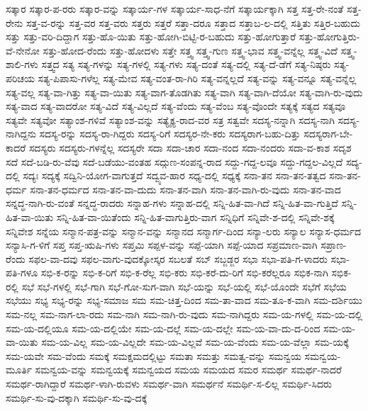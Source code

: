 {ಸತ್ಕಾರ
ಸತ್ಕಾರ-ಪ-ರರು
ಸತ್ಕಾರ-ವನ್ನು
ಸತ್ಕಾರ್ಯ-ಗಳ
ಸತ್ಕಾರ್ಯ-ಸಾಧ-ನೆಗೆ
ಸತ್ಕಾರ್ಯಕ್ಕಾಗಿ
ಸತ್ತ
ಸತ್ತ-ರೇ-ನಂತೆ
ಸತ್ತ-ರೇನು
ಸತ್ತ-ವ-ರನ್ನು
ಸತ್ತ-ವರ
ಸತ್ತ-ವರು
ಸತ್ತರು
ಸತ್ತರೆ
ಸತ್ತಾ-ದರೂ
ಸತ್ತಾದ
ಸತ್ತಾಬ-ಲ-ದಲ್ಲಿ
ಸತ್ತಿತು
ಸತ್ತಿರ-ಬಹುದು
ಸತ್ತು
ಸತ್ತು-ವರಿ-ದಿದ್ದಾಗ
ಸತ್ತು-ಹೊ-ಯಿತು
ಸತ್ತು-ಹೋಗಿ-ಬಿಟ್ಟಿ-ರ-ಬಹುದು
ಸತ್ತು-ಹೋಗುತ್ತಾರೆ
ಸತ್ತು-ಹೋಗುತ್ತಿರು-ವೆ-ನೇನೋ
ಸತ್ತು-ಹೋದ-ರೆಂದು
ಸತ್ತು-ಹೋದಳು
ಸತ್ತೇ
ಸತ್ತ್ವ
ಸತ್ತ್ವ-ಗುಣ
ಸತ್ತ್ವ-ಭಾವ
ಸತ್ತ್ವ-ವನ್ನೆಲ್ಲ
ಸತ್ತ್ವ-ವಿದೆ
ಸತ್ತ್ವ-ಶಾಲಿ-ಗಳು
ಸತ್ತ್ವದ
ಸತ್ಯ
ಸತ್ಯ-ಗಳನ್ನು
ಸತ್ಯ-ಗಳಲ್ಲಿ
ಸತ್ಯ-ಗಳು
ಸತ್ಯ-ದಂತೆ
ಸತ್ಯ-ದಲ್ಲಿ
ಸತ್ಯ-ದೆ-ಡೆಗೆ
ಸತ್ಯ-ನಿಷ್ಠರು
ಸತ್ಯ-ಪರಿಚಯ
ಸತ್ಯ-ಪಿಪಾಸು-ಗಳೆಲ್ಲ
ಸತ್ಯ-ಮೇವ
ಸತ್ಯ-ವಂತ-ರಾ-ಗಿರಿ
ಸತ್ಯ-ವನ್ನಲ್ಲದೆ
ಸತ್ಯ-ವನ್ನು
ಸತ್ಯ-ವನ್ನೂ
ಸತ್ಯ-ವನ್ನೆಲ್ಲ
ಸತ್ಯ-ವಲ್ಲ
ಸತ್ಯ-ವಾ-ಗಿತ್ತು
ಸತ್ಯ-ವಾ-ಯಿತು
ಸತ್ಯ-ವಾಗ-ತೊಡಗಿತು
ಸತ್ಯ-ವಾಗಿ
ಸತ್ಯ-ವಾಗಿ-ದೆಯೋ
ಸತ್ಯ-ವಾಗಿ-ರು-ವುದು
ಸತ್ಯ-ವಾದ
ಸತ್ಯ-ವಾದರೋ
ಸತ್ಯ-ವಿದೆ
ಸತ್ಯ-ವಿಲ್ಲದೆ
ಸತ್ಯ-ವೆಂದು
ಸತ್ಯ-ವೆಂಬ
ಸತ್ಯ-ವೊಂದೇ
ಸತ್ಯಕ್ಕೆ
ಸತ್ಯದ
ಸತ್ಯವೂ
ಸತ್ಯವೇ
ಸತ್ಯವೋ
ಸತ್ಯಾಂಶ-ಗಳಿವೆ
ಸತ್ಯಾಂಶ-ವನ್ನು
ಸತ್ಯೈಕ್ಯ-ರಾದ-ವರ
ಸತ್ರ
ಸತ್ವವೇ
ಸದಸ್ಯ-ನನ್ನಾಗಿ
ಸದಸ್ಯ-ನಾಗಿ
ಸದಸ್ಯ-ನಾಗಿದ್ದನು
ಸದಸ್ಯ-ರನ್ನು
ಸದಸ್ಯ-ರಾ-ಗಿದ್ದರು
ಸದಸ್ಯ-ರಿಗೆ
ಸದಸ್ಯರ-ನೇ-ಕರು
ಸದಸ್ಯರಾಗ-ಬಹು-ದಿತ್ತು
ಸದಸ್ಯರಾಗ-ಬೇ-ಕಾದರೆ
ಸದಸ್ಯರು
ಸದಸ್ಯರು-ಗಳನ್ನೆಲ್ಲ
ಸದಸ್ಯರೇ
ಸದಾ
ಸದಾ-ಚಾರ
ಸದಾ-ನಂದ
ಸದಾ-ನಂದರು
ಸದಾ-ವ-ಕಾಶ
ಸದೃಶ
ಸದೆ
ಸದೆ-ಬಡಿ-ರು-ವೆವು
ಸದೆ-ಬಡೆಯು-ವಂತಹ
ಸದ್ಗುಣ-ಸಂಪನ್ನ-ರಾದ
ಸದ್ದು-ಗದ್ದ-ಲವೂ
ಸದ್ದು-ಗದ್ದಲ-ವಿಲ್ಲದೆ
ಸದ್ಯ-ದಲ್ಲಿ
ಸದ್ಯಃ
ಸದ್ಯಕ್ಕೆ
ಸದ್ವಿನಿ-ಯೋಗ-ವಾಗುತ್ತದೆ
ಸದ್ವ್ಯವ-ಹಾರ
ಸಧ್ಯ-ದಲ್ಲಿ
ಸಧ್ಯಕ್ಕೆ
ಸನಾ-ತನ
ಸನಾ-ತನ-ತತ್ವದ
ಸನಾ-ತನ-ಧರ್ಮ
ಸನಾ-ತನ-ಧರ್ಮದ
ಸನಾ-ತನ-ವಾ-ದುದು
ಸನಾ-ತನ-ವಾಗಿ
ಸನಾ-ತನ-ವಾಗಿ-ರು-ವುದು
ಸನಾ-ತನ-ವಾದ
ಸನ್ನದ್ಧ-ನಾಗಿ-ರು-ವಂತೆ
ಸನ್ನದ್ಧ-ರಾದರು
ಸನ್ನಾಹ-ಗಳು
ಸನ್ನಾಹ-ದಲ್ಲಿ
ಸನ್ನಿ-ಹಿತ-ವಾ-ಗಿದೆ
ಸನ್ನಿ-ಹಿತ-ವಾ-ಗುತ್ತಿದೆ
ಸನ್ನಿ-ಹಿತ-ವಾ-ಯಿತು
ಸನ್ನಿ-ಹಿತ-ವಾ-ಯಿತೆಂದು
ಸನ್ನಿ-ಹಿತ-ವಾಗುತ್ತಿರು-ವಾಗ
ಸನ್ನಿಧಿಗೆ
ಸನ್ನಿವೇ-ಶ-ದಲ್ಲಿ
ಸನ್ನಿವೇ-ಶಕ್ಕೆ
ಸನ್ನಿವೇಶ
ಸನ್ನೆಯ
ಸನ್ಮಾನ-ಪತ್ರ-ವನ್ನು
ಸನ್ಮಾನ-ವನ್ನು
ಸನ್ಮಾನದ
ಸನ್ಮಾರ್ಗ-ದಿಂದ
ಸನ್ಯಾ-ಲರು
ಸನ್ಯಾಲ
ಸನ್ಯಾಸ-ಧರ್ಮದ
ಸನ್ಯಾಸಿ-ಗ-ಳಿಗೆ
ಸಪ್ತ
ಸಪ್ತ-ಋಷಿ-ಗಳು
ಸಪ್ತಮಿ
ಸಪ್ಪಳ-ವನ್ನು
ಸಪ್ಪೆ-ಯಾಗಿ
ಸಪ್ಪೆ-ಯಾದ
ಸಪ್ರಮಾಣ-ವಾಗಿ
ಸಪ್ರಾಣ-ರೆಂದು
ಸಫಲ-ವಾ-ದವು
ಸಫಲ-ವಾಗು-ವುದಕ್ಕೋಸ್ಕರ
ಸಬಲತೆ
ಸಬ್
ಸಬ್ಜಡ್ಜರ
ಸಭಾ
ಸಭಾ-ಪತಿ-ಗ-ಳಾದರು
ಸಭಾ-ಪತಿ-ಗಳೂ
ಸಭಿ-ಕ-ರನ್ನು
ಸಭಿ-ಕ-ರಿಗೆ
ಸಭಿ-ಕ-ರೆಲ್ಲ
ಸಭಿ-ಕರು
ಸಭಿ-ಕರೆ-ದು-ರಿಗೆ
ಸಭಿ-ಕರೆಲ್ಲರೂ
ಸಭಿಕ-ನಾಗಿ
ಸಭಿಕ-ರಲ್ಲಿ
ಸಭೆ
ಸಭೆ-ಗಳಲ್ಲಿ
ಸಭೆ-ಗಾಗಿ
ಸಭೆ-ಗೋ-ಸುಗ-ವಾಗಿ
ಸಭೆ-ಯನ್ನು
ಸಭೆ-ಯಲ್ಲಿ
ಸಭೆ-ಯೊಂದೇ
ಸಭೆಗೆ
ಸಭೆಯ
ಸಭೆಯು
ಸಭ್ಯ
ಸಭ್ಯ-ರನ್ನು
ಸಭ್ಯ-ಸಮಾಜ
ಸಮ
ಸಮ-ಚಿತ್ತ-ದಿಂದ
ಸಮ-ತಾ-ವಾದ
ಸಮ-ತೂ-ಕ-ವಾಗಿ
ಸಮ-ದರ್ಶಿಯು
ಸಮ-ನಲ್ಲ
ಸಮ-ನಾಗ-ಲಾ-ರದು
ಸಮ-ನಾಗಿ
ಸಮ-ನಾಗಿ-ರು-ವುದು
ಸಮ-ನಾಗಿದ್ದರು
ಸಮ-ಯ-ಗಳಲ್ಲಿ
ಸಮ-ಯ-ದಲ್ಲಿ
ಸಮ-ಯ-ದಲ್ಲಿಯೂ
ಸಮ-ಯ-ದಲ್ಲಿಯೇ
ಸಮ-ಯ-ದಲ್ಲೆ
ಸಮ-ಯ-ದಲ್ಲೇ
ಸಮ-ಯ-ವಾ-ದು-ದ-ರಿಂದ
ಸಮ-ಯ-ವಾ-ಯಿತು
ಸಮ-ಯ-ವಿಲ್ಲ
ಸಮ-ಯ-ವಿಲ್ಲದೇ
ಸಮ-ಯ-ವಿಲ್ಲವೆ
ಸಮ-ಯ-ವೆಂದು
ಸಮ-ಯ-ವೆಲ್ಲಾ
ಸಮ-ಯಕ್ಕೆ
ಸಮ-ಯವೇ
ಸಮ-ವೆಂದು
ಸಮಕ್ಕೆ
ಸಮಕ್ಷಮದಲ್ಲಿಟ್ಟು
ಸಮತಾ
ಸಮತ್ತು
ಸಮತ್ವ-ವನ್ನು
ಸಮನ್ವಯ
ಸಮನ್ವಯ-ಮೂರ್ತಿ
ಸಮನ್ವಯ-ವನ್ನು
ಸಮನ್ವಯಕ್ಕೆ
ಸಮನ್ವಯದ
ಸಮಯ
ಸಮಯದ
ಸಮರ
ಸಮರ್ಥ
ಸಮರ್ಥ-ನಾದರೆ
ಸಮರ್ಥ-ರಾಗಿದ್ದಾರೆ
ಸಮರ್ಥ-ಳಾಗಿ-ರುವಳು
ಸಮರ್ಥ-ವಾಗಿ
ಸಮರ್ಥನೆ
ಸಮರ್ಥಿ-ಸ-ಲಿಲ್ಲ
ಸಮರ್ಥಿ-ಸಿದರು
ಸಮರ್ಥಿ-ಸು-ವು-ದಕ್ಕಾಗಿ
ಸಮರ್ಥಿ-ಸು-ವು-ದಕ್ಕೆ
}
